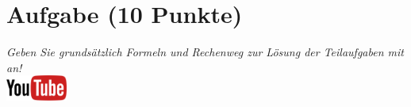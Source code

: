 \documentclass[a4paper, 10pt]{scrartcl}\usepackage[]{graphicx}\usepackage[]{xcolor}
\begin{document}
 
\clearpage

\section{Aufgabe \hfill (10 Punkte)}

\textit{Geben Sie grunds{\"a}tzlich Formeln und Rechenweg zur L{\"o}sung der
  Teilaufgaben mit an!} \\[1Ex]

\hfill\href{https://youtu.be/paXxVmyfDPs}{\includegraphics[width =
  2cm]{img/youtube}} %
\hspace{2Ex}

\vspace{1Ex}
\end{document}
